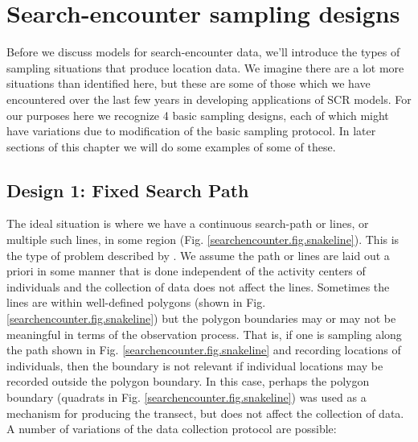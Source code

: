 \section{Search-encounter sampling designs}

Before we discuss models for search-encounter data, we'll
introduce the types of sampling situations that
produce location data.  We imagine there are a lot more situations
than identified here, but these are some of those which we have
encountered over the last few years in developing applications of SCR
models.  For our purposes here we recognize 4 basic sampling designs,
each of which might have variations due to modification of the basic
sampling protocol. In later sections of this chapter we will do some
examples of some of these.

\subsection{Design 1: Fixed Search Path}

The ideal situation is where we have a continuous search-path or
lines, or multiple such lines, in some region
(Fig. \ref{searchencounter.fig.snakeline}). This is the type of
problem described by \citet{royle_etal:2011mee}. We assume the path or
lines are laid out a priori in some manner that is done independent of
the activity centers of individuals and the collection of data does
not affect the lines. Sometimes the lines are within well-defined
polygons (shown in Fig. \ref{searchencounter.fig.snakeline}) but the
polygon boundaries may or may not be meaningful in terms of the
observation process. That is, if one is sampling along the path shown
in Fig. \ref{searchencounter.fig.snakeline} and recording locations of
individuals, then the boundary is not relevant if individual locations
may be recorded outside the polygon boundary. In this case, perhaps
the polygon boundary (quadrats in
Fig. \ref{searchencounter.fig.snakeline}) was used as a mechanism for
producing the transect, but does not affect the collection of data.  A
number of variations of the data collection protocol are possible:

